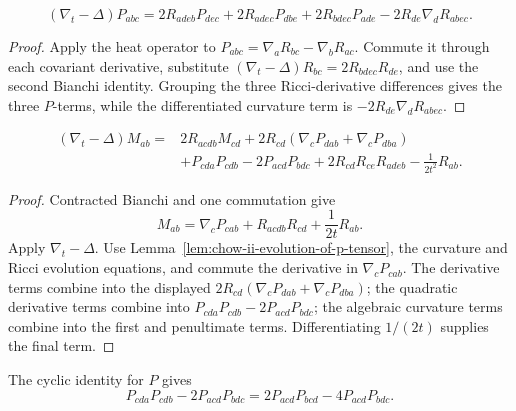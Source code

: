 \begin{lemma}
\label{lem:chow-ii-evolution-of-p-tensor}
\[
(\nabla_t-\Delta)P_{abc}=2R_{adeb}P_{dec}+2R_{adec}P_{dbe}
+2R_{bdec}P_{ade}-2R_{de}\nabla_dR_{abec}.
\]
\end{lemma}
\begin{proof}
\sketch Apply the heat operator to
\(P_{abc}=\nabla_aR_{bc}-\nabla_bR_{ac}\).  Commute it through each
covariant derivative, substitute
\((\nabla_t-\Delta)R_{bc}=2R_{bdec}R_{de}\), and use the second Bianchi
identity.  Grouping the three Ricci-derivative differences gives the three
\(P\)-terms, while the differentiated curvature term is
\(-2R_{de}\nabla_dR_{abec}\).
\end{proof}

\begin{lemma}
\label{lem:chow-ii-evolution-of-m-tensor}
\[
\begin{aligned}
(\nabla_t-\Delta)M_{ab}={}&2R_{acdb}M_{cd}
+2R_{cd}(\nabla_cP_{dab}+\nabla_cP_{dba})\\
&+P_{cda}P_{cdb}-2P_{acd}P_{bdc}
+2R_{cd}R_{ce}R_{adeb}-\frac1{2t^2}R_{ab}.
\end{aligned}
\]
\end{lemma}
\begin{proof}
\sketch Contracted Bianchi and one commutation give
\[
M_{ab}=\nabla_cP_{cab}+R_{acdb}R_{cd}+\frac1{2t}R_{ab}.
\]
Apply \(\nabla_t-\Delta\).  Use Lemma~\ref{lem:chow-ii-evolution-of-p-tensor},
the curvature and Ricci evolution equations, and commute the derivative in
\(\nabla_cP_{cab}\).  The derivative terms combine into the displayed
\(2R_{cd}(\nabla_cP_{dab}+\nabla_cP_{dba})\); the quadratic derivative terms
combine into \(P_{cda}P_{cdb}-2P_{acd}P_{bdc}\); the algebraic curvature
terms combine into the first and penultimate terms.  Differentiating
\(1/(2t)\) supplies the final term.
\end{proof}

\begin{remark}
\label{rem:chow-ii-m-evolution-equivalent-p-terms}
The cyclic identity for \(P\) gives
\[
P_{cda}P_{cdb}-2P_{acd}P_{bdc}
=2P_{acd}P_{bcd}-4P_{acd}P_{bdc}.
\]
\end{remark}

